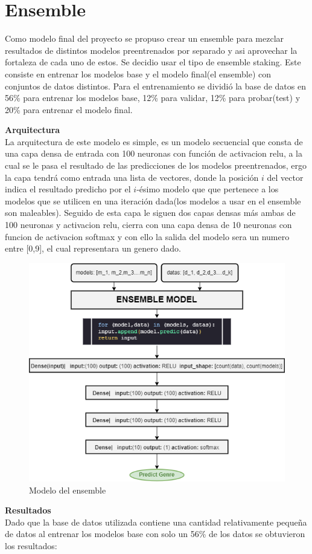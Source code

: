 \documentclass[colorinlistoftodos,twoside,twocolumn,10pt]{article} %
\begin{document}
\section{Ensemble}

Como modelo final del proyecto se propuso crear un ensemble para mezclar resultados de distintos modelos preentrenados por separado y asi aprovechar la fortaleza de cada uno de estos. Se decidio usar el tipo de ensemble staking. Este consiste en entrenar los modelos base y el modelo final(el ensemble) con conjuntos de datos distintos. Para el entrenamiento se dividi\'o la base de datos en 56\% para entrenar los modelos base, 12\% para validar, 12\% para probar(test) y 20\% para entrenar el modelo final.

\textbf{\large Arquitectura}\\
La arquitectura de este modelo es simple, es un modelo secuencial que consta de una capa densa de entrada con 100 neuronas con funci\'on de activacion relu, a la cual se le pasa el resultado de las predicciones de los modelos preentrenados, ergo la capa tendr\'a como entrada una lista de vectores, donde la posici\'on $i$ del vector indica el resultado predicho por el $i$-\'esimo modelo que que pertenece a los modelos que se utilicen en una iteraci\'on dada(los modelos a usar en el ensemble son maleables).
Seguido de esta capa le siguen dos capas densas m\'as ambas de 100 neuronas y activacion relu, cierra con una capa densa de 10 neuronas con funcion de activacion softmax y con ello la salida del modelo sera un numero entre [0,9], el cual representara un genero dado.

\begin{figure}[h!] %
	\centering
	\includegraphics[width=0.9\linewidth]{ensemble.png}
	\caption{Modelo del ensemble}
\end{figure}
\textbf{\large Resultados}\\
Dado que la base de datos utilizada contiene una cantidad relativamente peque\~na de datos al entrenar los modelos base con solo un 56\% de los datos se obtuvieron los resultados: 
\end{document}
